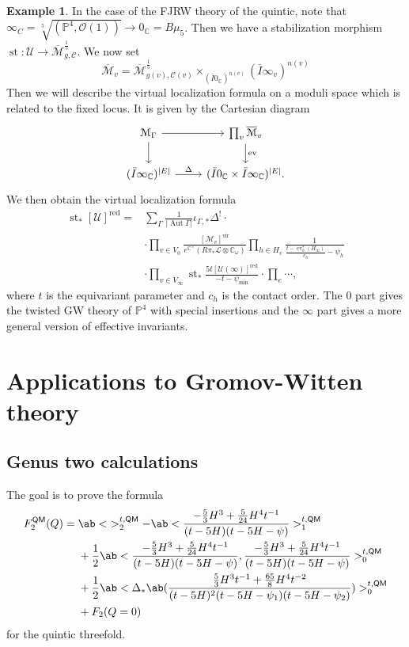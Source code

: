 \documentclass[10pt,oldfontcommands,oneside]{memoir}
\theoremstyle{definition}
\newtheorem{exm}[thm]{Example}
\theoremstyle{remark}
\theoremstyle{plain}
\theoremstyle{definition}
\theoremstyle{remark}
\newcommand{\C}{\mathbb{C}}
\renewcommand{\P}{\mathbb{P}}
\newcommand{\Mbar}{\overline{\mathcal{M}}}
\newcommand{\mc}[1]{\mathcal{#1}}
\newcommand{\mr}[1]{\mathrm{#1}}
\newcommand{\on}[1]{\operatorname{#1}}
\newcommand{\ms}[1]{\mathsf{#1}}
\newcommand{\1}{\mathbf{1}}
\newcommand{\2}{\mathbf{2}}
\newcommand{\3}{\mathbf{3}}
\newcommand{\vir}{\mr{vir}}
\newcommand{\red}{\mr{red}}
\newcommand{\QM}{\ms{QM}}
\DeclareMathOperator{\Aut}{Aut}
\DeclareMathOperator{\ev}{ev}
\begin{document}
\begin{exm}
    In the case of the FJRW theory of the quintic, note that $\infty_C = \sqrt[5]{(\P^4, \mc{O}(1))} \to 0_{\C} = B\mu_5$. Then we have a stabilization morphism $\on{st} \colon\mc{U} \to \Mbar^{\frac{1}{5}}_{g,\mc{C}}$. We now set
    \[ \Mbar_v = \Mbar^{\frac{1}{5}}_{g(v), \mc{C}(v)} \times_{( \bar{I}0_{\C} )^{n(v)}} (\bar{I}\infty_{v})^{n(v)} \]
    Then we will describe the virtual localization formula on a moduli space which is related to the fixed locus. It is given by the Cartesian diagram
    \begin{equation*}
    \begin{tikzcd}
        \mc{M}_{\Gamma} \ar{r} \ar{d} & \prod_v \Mbar_v \ar{d}{\ev} \\
        (\bar{I}\infty_{\C})^{|E|} \ar{r}{\Delta} & (\bar{I}0_{\C} \times \bar{I}\infty_{\C})^{|E|}.
    \end{tikzcd}
    \end{equation*}
    We then obtain the virtual localization formula
    \begin{align*}
        \on{st}_* [\mc{U}]^{\red} ={}& \sum_{\Gamma} \frac{1}{|\Aut \Gamma|} \iota_{\Gamma,*} \Delta^! \cdot \\
        &\cdot \prod_{v \in V_0} \frac{[\mc{M}_v]^{\vir}}{e^{\C^{\times}}(R\pi_* \mc{L} \otimes \C_{\omega})} \prod_{h \in H_v} \frac{1}{\frac{ t-\ev_h^*(H_{\infty}) }{c_h} - \psi_h} \\
        &\cdot \prod_{v \in V_{\infty}} \on{st}_* \frac{5t [\mc{U}(\infty)]^{\red}}{-t-\psi_{\min}} 
        \cdot \prod_{e} \cdots,
    \end{align*}
    where $t$ is the equivariant parameter and $c_h$ is the contact order. The $0$ part gives the twisted GW theory of $\P^4$ with special insertions and the $\infty$ part gives a more general version of effective invariants.
\end{exm}


\section{Applications to Gromov-Witten theory}%
\label{sec:Calculationslogglsm}

\subsection{Genus two calculations}%
\label{sub:Genus two calculations}

The goal is to prove the formula
\begin{align}
    F_2^{\QM}(Q) ={}& \ab<\ >_2^{t,\QM} - \ab< \frac{-\frac{5}{3}H^3 + \frac{5}{24}H^4t^{-1}}{(t-5H)(t-5H-\psi)}>_1^{t,\QM} \\
    &+ \frac{1}{2} \ab<\frac{-\frac{5}{3}H^3 + \frac{5}{24}H^4 t^{-1}}{(t-5H)(t-5H-\psi)}, \frac{-\frac{5}{3}H^3 + \frac{5}{24}H^4 t^{-1}}{(t-5H)(t-5H-\psi)}>_0^{t,\QM} \label{eqn:c} \\
    &+ \frac{1}{2} \ab<\Delta_* \ab(\frac{\frac{5}{3} H^3 t^{-1}+ \frac{65}{8}H^4 t^{-2}}{(t-5H)^2(t-5H-\psi_1)(t-5H-\psi_2)})>_0^{t,\QM} \label{eqn:d} \\
    &+ F_2(Q=0)
\end{align}
for the quintic threefold.
\end{document}
